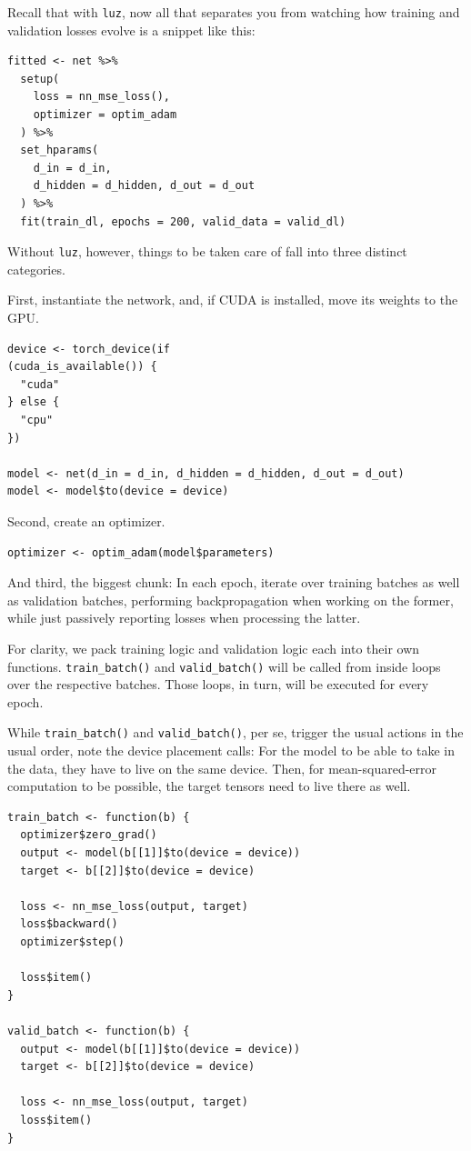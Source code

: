 \documentclass[
  letterpaper,
]{krantz}
\begin{document}
Recall that with \texttt{luz}, now all that separates you from watching
how training and validation losses evolve is a snippet like this:

\begin{verbatim}
fitted <- net %>%
  setup(
    loss = nn_mse_loss(),
    optimizer = optim_adam
  ) %>%
  set_hparams(
    d_in = d_in,
    d_hidden = d_hidden, d_out = d_out
  ) %>%
  fit(train_dl, epochs = 200, valid_data = valid_dl)
\end{verbatim}

Without \texttt{luz}, however, things to be taken care of fall into
three distinct categories.

First, instantiate the network, and, if CUDA is installed, move its
weights to the GPU.

\begin{verbatim}
device <- torch_device(if
(cuda_is_available()) {
  "cuda"
} else {
  "cpu"
})

model <- net(d_in = d_in, d_hidden = d_hidden, d_out = d_out)
model <- model$to(device = device)
\end{verbatim}

Second, create an optimizer.

\begin{verbatim}
optimizer <- optim_adam(model$parameters)
\end{verbatim}

And third, the biggest chunk: In each epoch, iterate over training
batches as well as validation batches, performing backpropagation when
working on the former, while just passively reporting losses when
processing the latter.

For clarity, we pack training logic and validation logic each into their
own functions. \texttt{train\_batch()} and \texttt{valid\_batch()} will
be called from inside loops over the respective batches. Those loops, in
turn, will be executed for every epoch.

While \texttt{train\_batch()} and \texttt{valid\_batch()}, per se,
trigger the usual actions in the usual order, note the device placement
calls: For the model to be able to take in the data, they have to live
on the same device. Then, for mean-squared-error computation to be
possible, the target tensors need to live there as well.

\begin{verbatim}
train_batch <- function(b) {
  optimizer$zero_grad()
  output <- model(b[[1]]$to(device = device))
  target <- b[[2]]$to(device = device)

  loss <- nn_mse_loss(output, target)
  loss$backward()
  optimizer$step()

  loss$item()
}

valid_batch <- function(b) {
  output <- model(b[[1]]$to(device = device))
  target <- b[[2]]$to(device = device)

  loss <- nn_mse_loss(output, target)
  loss$item()
}
\end{verbatim}
\end{document}

